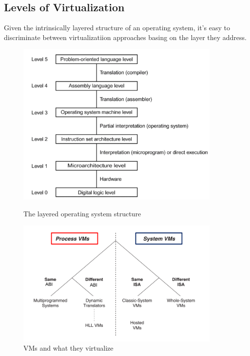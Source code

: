 \documentclass{article}
\begin{document}
			\subsection{Levels of Virtualization}
				Given the intrinsically layered structure of an operating system, it's easy to discriminate between virtualizatiion approaches basing on the layer they address.
				\begin{figure}[H]
					\centering
					\begin{minipage}{0.45\textwidth}
						\centering
						\includegraphics[width=0.9\textwidth]{./images/layers.png}
						\caption{The layered operating system structure}
					\end{minipage}\hfill
					\begin{minipage}{0.45\textwidth}
						\centering
						\includegraphics[width=0.9\textwidth]{./images/vms.png}
						\caption{VMs and what they virtualize}
					\end{minipage}
				\end{figure}
				
\end{document}
